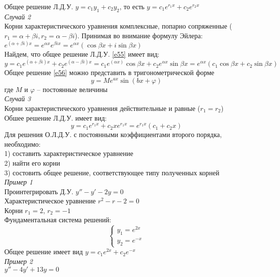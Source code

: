 \documentclass{article}
\numberwithin{equation}{section}
\begin{document}
Общее решение Л.Д.У. $y=c_1y_1+c_2y_2$, то есть $y=c_1e^{r_1x}+c_2e^{r_2x}$\\
\textit{Случай 2}\\
Корни характеристического уравнения комплексные, попарно сопряженные ($r_1=\alpha+\beta i, r_2=\alpha-\beta i$). Принимая во внимание формулу Эйлера: $e^{(\alpha+\beta i)x}=e^{\alpha x}e^{\beta ix}=e^{\alpha x}(\cos\beta x+i\sin\beta x)$\\
Найдем, что общее решение Л.Д.У. \eqref{e55} имеет вид:
\begin{equation}\label{e56}
y=c_1e^{(\alpha+\beta i)x}+c_2e^{(\alpha-\beta i)x}=c_1e^{(\alpha x)}\cos\beta x+c_2e^{\alpha x}\sin\beta x=e^{\alpha x}(c_1\cos\beta x+c_2\sin\beta x)
\end{equation}
Общее решение \eqref{e56} можно представить в тригонометрической форме
\begin{equation}\label{e57}
y=Me^{ax}\sin(bx+\varphi)
\end{equation}
где $M$ и $\varphi$ -- постоянные величины\\
\textit{Случай 3}\\
Корни характеристического уравнения действительные и равные ($r_1=r_2$)\\
Обшее решение Л.Д.У. имеет вид:
\begin{equation}\label{e58}
y=c_1e^{r_1x}+c_2xe^{r_1x}=e^{r_1x}(c_1+c_2x)
\end{equation}
Для решения О.Л.Д.У. с постоянными коэффициентами второго порядка, необходимо:\\
1) составить характеристическое уравнение\\
2) найти его корни\\
3) состовить общее решение, соответствующее типу полученных корней\\
\textit{Пример 1}\\
Проинтегрировать Д.У. $y''-y'-2y=0$\\
Характеристическое уравнение $r^2-r-2=0$\\
Корни $r_1=2$, $r_2=-1$\\
Фундаментальная система решений:
\begin{equation*}
\begin{cases}
y_1=e^{2x}\\
y_2=e^{-x}
\end{cases}
\end{equation*}
Общее решение имеет вид $y=c_1e^{2x}+c_2e^{-x}$\\
\textit{Пример 2}\\
$y''-4y'+13y=0$\\
\end{document}
